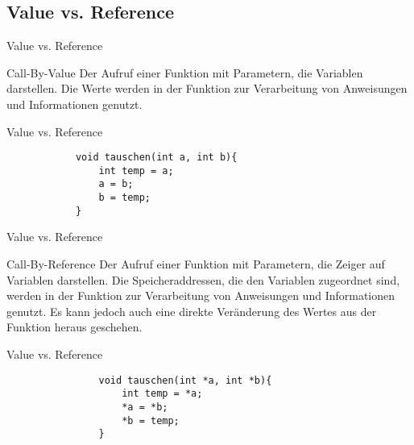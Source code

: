 \documentclass[usenames,dvipsnames,10pt]{beamer}
\begin{document}
    \subsection{Value vs. Reference}
    \begin{frame}{Value vs. Reference}
        \begin{block}{Call-By-Value}
            Der Aufruf einer Funktion mit Parametern, die Variablen
            darstellen. Die Werte werden in der Funktion zur Verarbeitung 
            von Anweisungen und Informationen genutzt.
        \end{block}
    \end{frame}
    \begin{frame}[fragile]{Value vs. Reference}
        \begin{lstlisting}
            void tauschen(int a, int b){
                int temp = a;
                a = b;
                b = temp;
            }
        \end{lstlisting}
    \end{frame}
    \begin{frame}{Value vs. Reference}
        \begin{block}{Call-By-Reference}
            Der Aufruf einer Funktion mit Parametern, die Zeiger auf Variablen
            darstellen. Die Speicheraddressen, die den Variablen zugeordnet sind, werden in der Funktion zur Verarbeitung 
            von Anweisungen und Informationen genutzt. Es kann jedoch auch eine direkte Veränderung des Wertes aus der Funktion heraus geschehen.
        \end{block}
    \end{frame}
    \begin{frame}[fragile]{Value vs. Reference}
            \begin{lstlisting}
                void tauschen(int *a, int *b){
                    int temp = *a;
                    *a = *b;
                    *b = temp;
                }
            \end{lstlisting}
    \end{frame}
\end{document}
